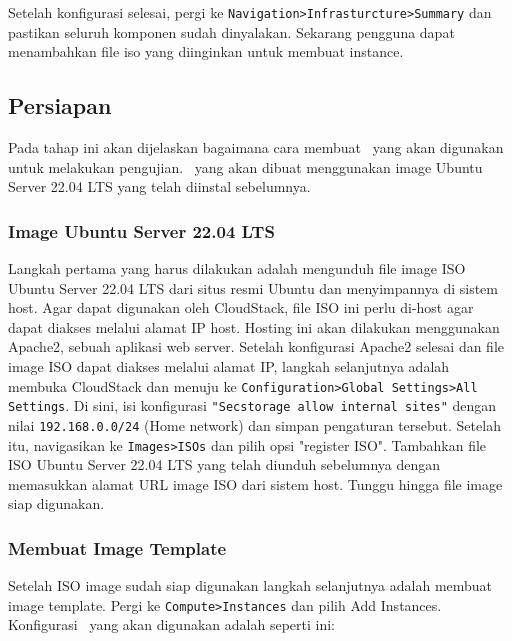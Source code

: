 Setelah konfigurasi selesai, pergi ke \texttt{Navigation>Infrasturcture>Summary} dan pastikan seluruh komponen sudah dinyalakan. Sekarang pengguna dapat menambahkan file iso yang diinginkan untuk membuat instance.

\subsection{Persiapan \vm}
Pada tahap ini akan dijelaskan bagaimana cara membuat \vm\ yang akan digunakan untuk melakukan pengujian. \vm\ yang akan dibuat menggunakan image Ubuntu Server 22.04 LTS yang telah diinstal sebelumnya.

\subsubsection{Image Ubuntu Server 22.04 LTS}
Langkah pertama yang harus dilakukan adalah mengunduh file image ISO Ubuntu Server 22.04 LTS dari situs resmi Ubuntu dan menyimpannya di sistem host. Agar dapat digunakan oleh CloudStack, file ISO ini perlu di-host agar dapat diakses melalui alamat IP host. Hosting ini akan dilakukan menggunakan Apache2, sebuah aplikasi web server. Setelah konfigurasi Apache2 selesai dan file image ISO dapat diakses melalui alamat IP, langkah selanjutnya adalah membuka CloudStack dan menuju ke \texttt{Configuration>Global Settings>All Settings}. Di sini, isi konfigurasi \texttt{"Secstorage allow internal sites"} dengan nilai \texttt{192.168.0.0/24} (Home network) dan simpan pengaturan tersebut. Setelah itu, navigasikan ke \texttt{Images>ISOs} dan pilih opsi "register ISO". Tambahkan file ISO Ubuntu Server 22.04 LTS yang telah diunduh sebelumnya dengan memasukkan alamat URL image ISO dari sistem host. Tunggu hingga file image siap digunakan.

\subsubsection{Membuat Image Template}
Setelah ISO image sudah siap digunakan langkah selanjutnya adalah membuat image template. Pergi ke \texttt{Compute>Instances} dan pilih Add Instances. Konfigurasi \vm\ yang akan digunakan adalah seperti ini:

